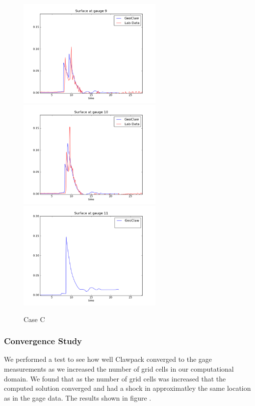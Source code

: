 \begin{figure}[ht]
\hfil\includegraphics[width=2.8in]{bp5/CaseC/gauge0009fig300.png}\hfil
\vskip 5pt
\hfil\includegraphics[width=2.8in]{bp5/CaseC/gauge0010fig300.png}\hfil
\hfil\includegraphics[width=2.8in]{bp5/CaseC/gauge0011fig300.png}\hfil
\caption{\label{fig:bp5C} Case C }
\end{figure}

\subsubsection{Convergence Study}
We performed a test to see how well Clawpack converged to the gage measurements as we increased the number of grid cells in our computational domain.  We found that as the number of grid cells was increased that the computed solution converged and had a shock in approximatley the same location as in the gage data.  The results shown in figure .


